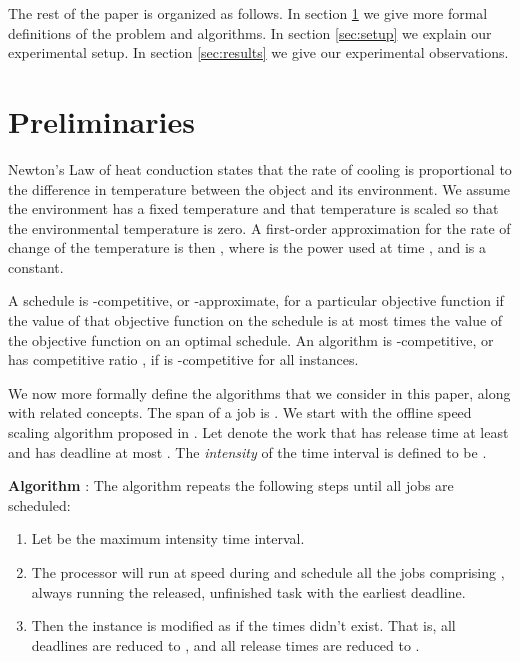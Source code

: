 \documentclass[11pt]{article}
\begin{document}
The rest of the paper is organized as follows. In section \ref{sec:preliminaries} we give more
formal definitions of the problem and algorithms.
In section \ref{sec:setup} we explain our experimental setup.
In section \ref{sec:results} we give our experimental observations.

\section{Preliminaries}
\label{sec:preliminaries} 





Newton's Law of heat conduction states that the rate of cooling is
proportional to the difference in temperature between the object and
its environment.
We assume the environment has a fixed temperature and that temperature
is scaled so that the environmental temperature is zero.
A first-order approximation for the rate of change  of the
temperature  is then , where  is the
power used at time , and  is a constant.



A schedule is -competitive, or -approximate,
for a particular objective function
if the value of that objective function on the schedule is at most
 times the value of the objective function on an optimal schedule.
An algorithm  
is -competitive, or has competitive ratio , if  is -competitive
for all instances.

We now more formally define the algorithms that we consider in this paper, along
with related concepts.
The span of a job  is .
We start with the offline speed scaling algorithm 
 proposed in \cite{YDS}.
Let   denote the work that has release time at least  and has
deadline  at most . The \emph{intensity}  
of the time interval  is
defined to be .

\medskip
\noindent
{\bf Algorithm \boldmath\unboldmath} \cite{YDS}:
The algorithm repeats the following steps until all jobs are scheduled:
\begin{enumerate}
\item
Let  be the maximum intensity time interval.
\item
The processor will
run at speed  during  and schedule all
the jobs comprising , always running the released, 
unfinished task with the earliest deadline. 
\item
Then the instance is modified as if the times  didn't exist.
That is, all deadlines  are reduced to
, and all release times 
are reduced to . 
\end{enumerate}
\end{document}
